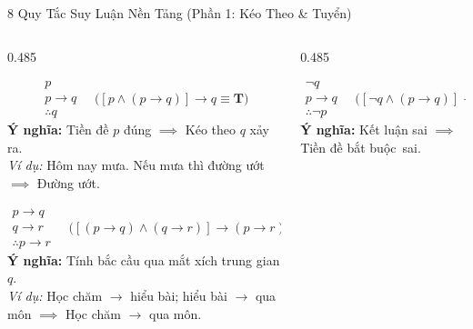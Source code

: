 \documentclass[aspectratio=169, 10pt]{beamer}
\begin{document}
\begin{frame}{8 Quy Tắc Suy Luận Nền Tảng (Phần 1: Kéo Theo \& Tuyển)}
  \begin{columns}[t, onlytextwidth]
    \begin{column}{0.485\textwidth}
      \begin{cozyDef}
        \scriptsize
        \vspace{-0.16cm}
        $$\begin{array}{l} p \\ p \to q \\ \hline \therefore q \end{array} \quad \Big( [p \land (p \to q)] \to q \equiv \mathbf{T} \Big)$$
        \textbf{Ý nghĩa:} Tiền đề $p$ đúng $\implies$ Kéo theo $q$ xảy ra.\\[2.5pt]
        \textit{Ví dụ:} Hôm nay mưa. Nếu mưa thì đường ướt $\implies$ Đường ướt.
      \end{cozyDef}
      \vspace{0.02cm}
      \begin{cozyDef}
        \scriptsize
        \vspace{-0.16cm}
        $$\begin{array}{l} p \to q \\ q \to r \\ \hline \therefore p \to r \end{array} \quad \Big( [(p \to q) \land (q \to r)] \to (p \to r) \equiv \mathbf{T} \Big)$$
        \textbf{Ý nghĩa:} Tính bắc cầu qua mắt xích trung gian $q$.\\[2.5pt]
        \textit{Ví dụ:} Học chăm $\to$ hiểu bài; hiểu bài $\to$ qua môn $\implies$ Học chăm $\to$ qua môn.
      \end{cozyDef}
    \end{column}
    \begin{column}{0.485\textwidth}
      \begin{cozyDef}
        \scriptsize
        \vspace{-0.16cm}
        $$\begin{array}{l} \neg q \\ p \to q \\ \hline \therefore \neg p \end{array} \quad \Big( [\neg q \land (p \to q)] \to \neg p \equiv \mathbf{T} \Big)$$
        \textbf{Ý nghĩa:} Kết luận sai $\implies$ Tiền đề bắt buộc~sai.\\[2.5pt]

\end{cozyDef}
\end{column}
\end{columns}
\end{frame}
\end{document}

